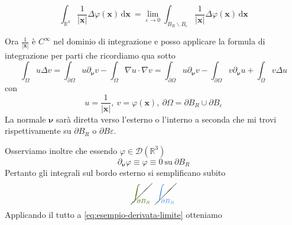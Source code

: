 \documentclass[10pt,a4paper,twoside,openright]{book}
\newcommand{\x}{\mathbf{x}}
\newcommand{\nuu}{\bm{\nu}}
\newcommand{\de}{\,\mathrm d}
\newcommand{\dxx}{\de \x}
\begin{document}
\begin{enumerate}
\begin{figure}[htpb]
\begin{tikzpicture}[x=0.75pt,y=0.75pt,yscale=-1,xscale=1]
	      		
	      	\end{tikzpicture}
	      \end{figure}
	      \FloatBarrier
	      \begin{equation}
	      	\int _{\mathbb{R}^{3}}\frac{1}{| \x| } \Delta \varphi (\x) \dxx \ =\lim _{\varepsilon \rightarrow 0}\int _{B_{R} \backslash B_{\varepsilon }}\frac{1}{| \x| } \Delta \varphi (\x) \dxx
	      	\label{eq:esempio-derivata-limite}
	      \end{equation}
\end{enumerate}

Ora $\displaystyle \frac{1}{| \x| }$ è $\displaystyle C^{\infty }$ nel dominio di integrazione e posso applicare la formula di integrazione per parti che ricordiamo qua sotto
\begin{equation*}
	\int _{\Omega } u\Delta v=\int _{\partial \Omega } u\partial _{\nuu} v-\int _{\Omega } \nabla u\cdotp \nabla v=\int _{\partial \Omega } u\partial _{\bm{\nu }} v-\int _{\partial \Omega } v\partial _{\bm{\nu }} u+\int _{\Omega } v\Delta u
\end{equation*}
con 
\begin{equation*}
	u=\frac{1}{| \x| } ,\ v=\varphi (\x) ,\ \partial \Omega =\partial B_{R} \cup \partial B_{\varepsilon }
\end{equation*}
La normale $\displaystyle \bm{\nu }$ sarà diretta verso l'esterno o l'interno a seconda che mi trovi rispettivamente su $\displaystyle \partial B_{R}$ o $\displaystyle \partial B\varepsilon $.

Osserviamo inoltre che essendo $\displaystyle \varphi \in \mathcal{D}\left(\mathbb{R}^{3}\right)$
\begin{equation*}
	\partial _{\bm{\nu }} \varphi \equiv \varphi \equiv 0\ \text{su} \ \partial B_{R}
\end{equation*}
Pertanto gli integrali sul bordo esterno si semplificano subito
\begin{equation*}
	\cancel{\textcolor[rgb]{0.25,0.46,0.02}{\int _{\partial B_{R}}}} \ \ \cancel{\textcolor[rgb]{0.29,0.56,0.89}{\int _{\partial B_{R}}}}
\end{equation*}
Applicando il tutto a \eqref{eq:esempio-derivata-limite} otteniamo
\end{document}
